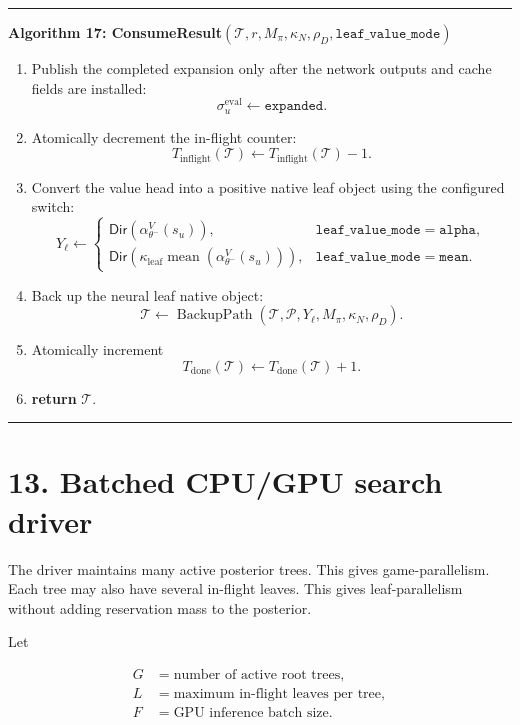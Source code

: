 \documentclass[11pt]{article}
\newcommand{\mean}{\operatorname{mean}}
\newcommand{\Tree}{\mathcal{T}}
\newcommand{\Path}{\mathcal{P}}
\newcommand{\BackupPath}{\operatorname{BackupPath}}
\newcommand{\DirObj}{\mathsf{Dir}}
\newenvironment{algorithmblock}[1]
{
  \par\medskip
  \noindent\hrule\par\smallskip
  \noindent\textbf{#1}
  \par\smallskip
}
{
  \par\smallskip\noindent\hrule\par\medskip
}
\newcommand{\Return}{\textbf{return }}
\begin{document}
\begin{algorithmblock}{Algorithm 17: ConsumeResult\((\Tree,r,M_\pi,\kappa_N,\rho_D,\texttt{leaf\_value\_mode})\)}
\begin{enumerate}[leftmargin=2em]
  \item Publish the completed expansion only after the network outputs and cache
  fields are installed:
  \[
  \sigma^{\mathrm{eval}}_u\gets\texttt{expanded}.
  \]

  \item Atomically decrement the in-flight counter:
  \[
  T_{\mathrm{inflight}}(\Tree)
  \gets
  T_{\mathrm{inflight}}(\Tree)-1.
  \]

  \item Convert the value head into a positive native leaf object using the
  configured switch:
  \[
  Y_\ell
  \gets
  \begin{cases}
  \DirObj(\alpha_{\theta^-}^V(s_u)),
  & \texttt{leaf\_value\_mode}=\texttt{alpha},\\[4pt]
  \DirObj\left(\kappa_{\mathrm{leaf}}
  \mean\left(\alpha_{\theta^-}^V(s_u)\right)\right),
  & \texttt{leaf\_value\_mode}=\texttt{mean}.
  \end{cases}
  \]

  \item Back up the neural leaf native object:
  \[
  \Tree
  \gets
  \BackupPath(\Tree,\Path,Y_\ell,M_\pi,\kappa_N,\rho_D).
  \]

  \item Atomically increment
  \[
  T_{\mathrm{done}}(\Tree)
  \gets
  T_{\mathrm{done}}(\Tree)+1.
  \]

  \item \Return \(\Tree\).
\end{enumerate}

\end{algorithmblock}

\section*{13. Batched CPU/GPU search driver}

The driver maintains many active posterior trees. This gives game-parallelism.
Each tree may also have several in-flight leaves. This gives leaf-parallelism
without adding reservation mass to the posterior.

Let

\[
\begin{aligned}
G &= \text{number of active root trees},\\
L &= \text{maximum in-flight leaves per tree},\\
F &= \text{GPU inference batch size}.
\end{aligned}
\]
\end{document}
